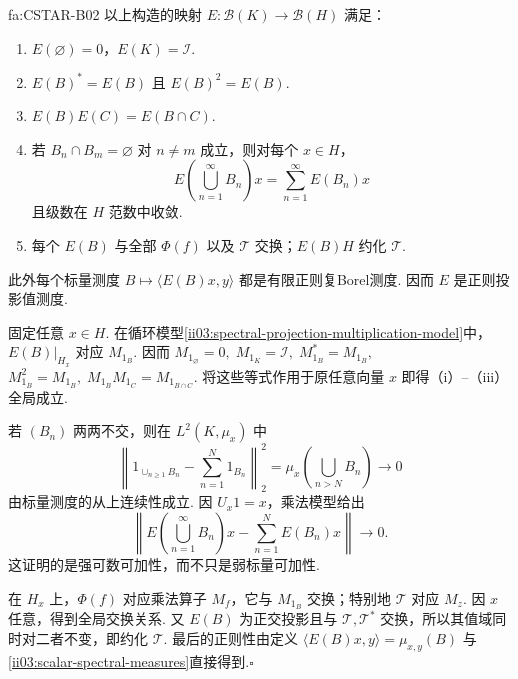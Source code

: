 \begin{FATheorem}[B][谱投影基本性质]{fa:CSTAR-B02}
以上构造的映射 \(\displaystyle E:\mathcal B(K)\to\mathcal B(H)\) 满足：
\begin{enumerate}[label=\textnormal{(\roman*)}]
\item \(\displaystyle E(\varnothing)=0\)，\(\displaystyle E(K)=\mathcal I\).
\item \(\displaystyle E(B)^*=E(B)\) 且 \(\displaystyle E(B)^2=E(B)\).
\item \(\displaystyle E(B)E(C)=E(B\cap C)\).
\item 若 \(\displaystyle B_n\cap B_m=\varnothing\) 对 \(\displaystyle n\neq m\) 成立，则对每个 \(\displaystyle x\in H\)，
\[
E\left(\bigcup_{n=1}^{\infty}B_n\right)x
=
\sum_{n=1}^{\infty}E(B_n)x
\]
且级数在 \(\displaystyle H\) 范数中收敛.
\item 每个 \(\displaystyle E(B)\) 与全部 \(\displaystyle\Phi(f)\) 以及 \(\displaystyle\mathcal T\) 交换；\(\displaystyle E(B)H\) 约化 \(\displaystyle\mathcal T\).
\end{enumerate}
此外每个标量测度 \(\displaystyle B\mapsto\langle E(B)x,y\rangle\) 都是有限正则复Borel测度. 因而 \(\displaystyle E\) 是正则投影值测度.
\end{FATheorem}

\begin{FAProof}
固定任意 \(\displaystyle x\in H\). 在循环模型\autoref{ii03:spectral-projection-multiplication-model}中，\(\displaystyle E(B)|_{H_x}\) 对应 \(\displaystyle M_{1_B}\). 因而
\(\displaystyle M_{1_\varnothing}=0, \; M_{1_K}=\mathcal I, \; M_{1_B}^*=M_{1_B},\)
\(\displaystyle M_{1_B}^2=M_{1_B}, \; M_{1_B}M_{1_C}=M_{1_{B\cap C}}.\)
将这些等式作用于原任意向量 \(\displaystyle x\) 即得（i）--（iii）全局成立.

若 \(\displaystyle(B_n)\) 两两不交，则在 \(\displaystyle L^2(K,\mu_x)\) 中
\[
\left\|
1_{\cup_{n\geqslant1}B_n}
-
\sum_{n=1}^N1_{B_n}
\right\|_2^2
=
\mu_x\left(\bigcup_{n>N}B_n\right)
\longrightarrow0
\]
由标量测度的从上连续性成立. 因 \(\displaystyle U_x1=x\)，乘法模型给出
\[
\left\|
E\left(\bigcup_{n=1}^{\infty}B_n\right)x
-
\sum_{n=1}^NE(B_n)x
\right\|
\longrightarrow0.
\]
这证明的是强可数可加性，而不只是弱标量可加性.

在 \(\displaystyle H_x\) 上，\(\displaystyle\Phi(f)\) 对应乘法算子 \(\displaystyle M_f\)，它与 \(\displaystyle M_{1_B}\) 交换；特别地 \(\displaystyle\mathcal T\) 对应 \(\displaystyle M_z\). 因 \(\displaystyle x\) 任意，得到全局交换关系. 又 \(\displaystyle E(B)\) 为正交投影且与 \(\displaystyle\mathcal T,\mathcal T^*\) 交换，所以其值域同时对二者不变，即约化 \(\displaystyle\mathcal T\). 最后的正则性由定义
\(\displaystyle \langle E(B)x,y\rangle=\mu_{x,y}(B)\)
与\autoref{ii03:scalar-spectral-measures}直接得到.\hfill\(\square\)
\end{FAProof}

